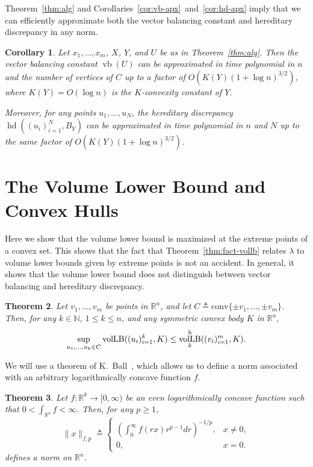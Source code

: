 \documentclass[11pt]{article}
\newtheorem{theorem}{Theorem}
\newtheorem{corollary}[theorem]{Corollary}
\newcommand{\R}{{\mathbb{R}}}
\newcommand{\eqdef}{\triangleq}
\DeclareMathOperator{\vollb}{volLB}
\DeclareMathOperator{\hd}{hd}
\DeclareMathOperator{\vb}{vb}
\begin{document}
Theorem~\ref{thm:alg} and
Corollaries~\ref{cor:vb-apx}~and~\ref{cor:hd-apx} imply that we can efficiently
approximate both the vector balancing constant and hereditary
discrepancy in any norm.

\begin{corollary}
  Let $x_1, \ldots, x_m$, $X$, $Y$, and $U$ be as in
  Theorem~\ref{thm:alg}.  Then the vector
  balancing constant $\vb(U)$ can be approximated in time
  polynomial in $n$ and the number of vertices of $C$ up to a factor
  of $O(K(Y)(1 + \log n)^{3/2})$, where $K(Y) = O(\log n)$ is the
  $K$-convexity constant of $Y$.

  Moreover, for any points $u_1, \ldots, u_N$, the hereditary
  discrepancy $\hd((u_i)_{i = 1}^N, B_Y)$ can be approximated in time
  polynomial in $n$ and $N$ up to the same factor of  $O(K(Y)(1 + \log
  n)^{3/2})$. 
\end{corollary}


\section{The Volume Lower Bound and Convex Hulls}
\label{sec:conv-hulls}

Here we show that the volume lower bound is maximized at the extreme
points of a convex set. This shows that the fact that
Theorem~\ref{thm:fact-vollb} relates $\lambda$ to volume lower bounds
given by extreme points is not an accident. In general, it shows that
the volume lower bound does not distinguish between vector balancing
and hereditary discrepancy. 

\begin{theorem}\label{thm:conv-hull}
  Let $v_1, \ldots, v_m$ be points in $\R^n$, and let $C \eqdef
  \mathrm{conv}\{\pm v_1, \ldots, \pm v_m\}$. Then, for any $k \in
  \mathbb{N}$, $1 \le k \le n$, and any symmetric convex body $K$ in
  $\R^n$,
  \[
  \sup_{u_1, \ldots, u_k \in C}\vollb((u_i)_{i = 1}^k, K)
  \le
  \vollb^{\rm h}_k((v_i)_{i = 1}^m, K).
  \]
\end{theorem}

We will use a theorem of K.~Ball~\cite{Ball88}, which allows us to
define a norm associated with an arbitrary logarithmically concave
function $f$.
\begin{theorem}\label{thm:ball-logconcave}
  Let $f: \R^k \to [0, \infty)$ be an even logarithmically concave
  function such that $0 < \int_{\R^k} f < \infty$. Then, for any $p
  \ge 1$, 
  \[
  \|x\|_{f,p} \eqdef 
  \begin{cases}
    \left(\int_0^\infty f(rx) r^{p-1}dr\right)^{-1/p}, &x \neq 0,\\
    0, &x = 0.
  \end{cases}
  \]
  defines a norm on $\R^n$. 
\end{theorem}
\end{document}
